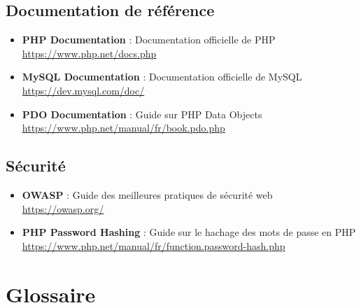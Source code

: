 \documentclass[12pt,a4paper]{report}
\begin{document}
\subsection{Documentation de référence}
\begin{itemize}
    \item \textbf{PHP Documentation} : Documentation officielle de PHP\\
    \url{https://www.php.net/docs.php}
    
    \item \textbf{MySQL Documentation} : Documentation officielle de MySQL\\
    \url{https://dev.mysql.com/doc/}
    
    \item \textbf{PDO Documentation} : Guide sur PHP Data Objects\\
    \url{https://www.php.net/manual/fr/book.pdo.php}
\end{itemize}

\subsection{Sécurité}
\begin{itemize}
    \item \textbf{OWASP} : Guide des meilleures pratiques de sécurité web\\
    \url{https://owasp.org/}
    
    \item \textbf{PHP Password Hashing} : Guide sur le hachage des mots de passe en PHP\\
    \url{https://www.php.net/manual/fr/function.password-hash.php}
\end{itemize}

\section{Glossaire}
\end{document}
